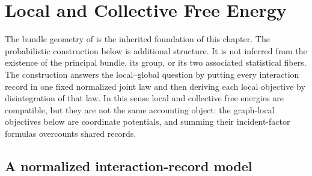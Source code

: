 \chapter{Local and Collective Free Energy}
\label{ch:local-collective-elbo}

The bundle geometry of  is the inherited foundation of this
chapter.  The probabilistic construction below is additional structure.  It is
not inferred from the existence of the principal bundle, its group, or its two
associated statistical fibers.  The construction answers the local--global
question by putting every interaction record in one fixed normalized joint law
and then deriving each local objective by disintegration of that law.  In this
sense local and collective free energies are compatible, but they are not the
same accounting object: the graph-local objectives below are coordinate
potentials, and summing their incident-factor formulas overcounts shared
records.

\section{A normalized interaction-record model}
\label{sec:local-interaction-record-model}

